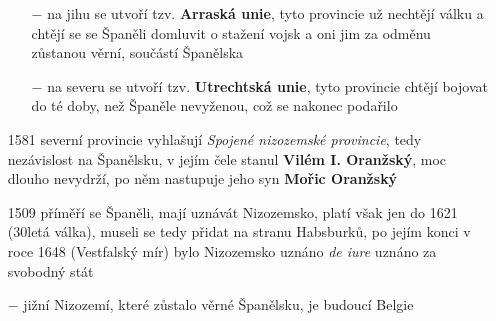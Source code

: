 \documentclass{article}
\begin{document}
\begin{itemize}
\begin{itemize}
        \item[$-$] na jihu se utvoří tzv. \textbf{Arraská unie}, tyto provincie už nechtějí válku a chtějí se se Španěli domluvit o stažení vojsk a oni jim za odměnu zůstanou věrní, součástí Španělska
        \item[$-$] na severu se utvoří tzv. \textbf{Utrechtská unie}, tyto provincie chtějí bojovat do té doby, než Španěle nevyženou, což se nakonec podařilo
    \end{itemize}
    \item[1581] severní provincie vyhlašují \textit{Spojené nizozemské provincie}, tedy nezávislost na Španělsku, v jejím čele stanul \textbf{Vilém I. Oranžský}, moc dlouho nevydrží, po něm nastupuje jeho syn \textbf{Mořic Oranžský}
    \item[1509] příměří se Španěli, mají uznávát Nizozemsko, platí však jen do 1621 (30letá válka), museli se tedy přidat na stranu Habsburků, po jejím konci v roce 1648 (Vestfalský mír) bylo Nizozemsko uznáno \textit{de iure} uznáno za svobodný stát
    \item[$-$] jižní Nizozemí, které zůstalo věrné Španělsku, je budoucí Belgie
\end{itemize}
\end{document}

